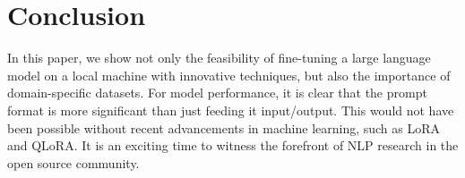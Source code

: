 \documentclass[12pt]{article}
\begin{document}
\section{Conclusion}
In this paper, we show not only the feasibility of fine-tuning a large language model on a local machine with innovative techniques, but also the importance of domain-specific datasets. For model performance, it is clear that the prompt format is more significant than just feeding it input/output. This would not have been possible without recent advancements in machine learning, such as LoRA and QLoRA. It is an exciting time to witness the forefront of NLP research in the open source community.
\newpage


\end{document}
